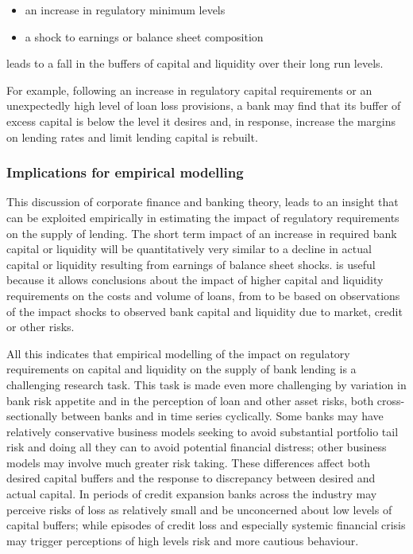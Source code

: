 \documentclass[
  12,
]{article}
\begin{document}
\begin{itemize}
    \item an increase in regulatory minimum levels
    \item a shock to earnings or balance sheet composition
\end{itemize}

leads to a fall in the buffers of capital and liquidity over their long run levels.

For example, following an increase in regulatory capital requirements or an unexpectedly high level of loan loss provisions, a bank may find that its buffer of excess capital is below the level it desires and, in response, increase the margins on lending rates and limit lending capital is rebuilt.

\hypertarget{implications-for-empirical-modelling}{%
\subsubsection{Implications for empirical modelling}\label{implications-for-empirical-modelling}}

This discussion of corporate finance and banking theory, leads to an insight that can be exploited empirically in estimating the impact of regulatory requirements on the supply of lending. The short term impact of an increase in required bank capital or liquidity will be quantitatively very similar to a decline in actual capital or liquidity resulting from earnings of balance sheet shocks. is useful because it allows conclusions about the impact of higher capital and liquidity requirements on the costs and volume of loans, from to be based on observations of the impact shocks to observed bank capital and liquidity due to market, credit or other risks.

All this indicates that empirical modelling of the impact on regulatory requirements on capital and liquidity on the supply of bank lending is a challenging research task. This task is made even more challenging by variation in bank risk appetite and in the perception of loan and other asset risks, both cross-sectionally between banks and in time series cyclically. Some banks may have relatively conservative business models seeking to avoid substantial portfolio tail risk and doing all they can to avoid potential financial distress; other business models may involve much greater risk taking. These differences affect both desired capital buffers and the response to discrepancy between desired and actual capital. In periods of credit expansion banks across the industry may perceive risks of loss as relatively small and be unconcerned about low levels of capital buffers; while episodes of credit loss and especially systemic financial crisis may trigger perceptions of high levels risk and more cautious behaviour.
\end{document}
